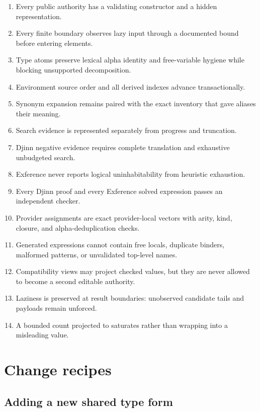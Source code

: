 \documentclass[10pt,letterpaper,oneside]{report}
\newcommand{\code}[1]{\texttt{\detokenize{#1}}}
\begin{document}
\begin{enumerate}
  \item Every public authority has a validating constructor and a hidden representation.
  \item Every finite boundary observes lazy input through a documented bound before entering elements.
  \item Type atoms preserve lexical alpha identity and free-variable hygiene while blocking unsupported decomposition.
  \item Environment source order and all derived indexes advance transactionally.
  \item Synonym expansion remains paired with the exact inventory that gave aliases their meaning.
  \item Search evidence is represented separately from progress and truncation.
  \item Djinn negative evidence requires complete translation and exhaustive unbudgeted search.
  \item Exference never reports logical uninhabitability from heuristic exhaustion.
  \item Every Djinn proof and every Exference solved expression passes an independent checker.
  \item Provider assignments are exact provider-local vectors with arity, kind, closure, and alpha-deduplication checks.
  \item Generated expressions cannot contain free locals, duplicate binders, malformed patterns, or unvalidated top-level names.
  \item Compatibility views may project checked values, but they are never allowed to become a second editable authority.
  \item Laziness is preserved at result boundaries: unobserved candidate tails and payloads remain unforced.
  \item A bounded count projected to \code{Int} saturates rather than wrapping into a misleading value.
\end{enumerate}

\chapter{Change recipes}\label{app:change-recipes}

\section{Adding a new shared type form}
\end{document}
